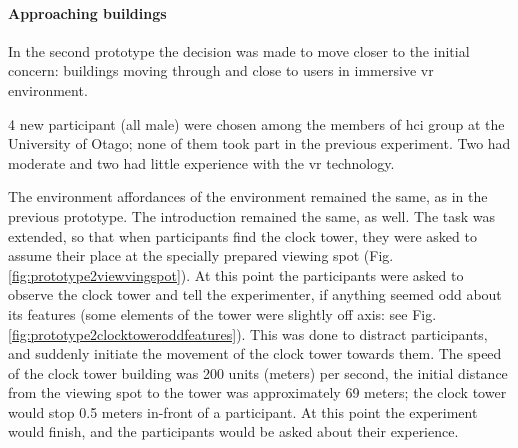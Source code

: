 \paragraph{Approaching buildings}
\label{par:approaching_building}
In the second prototype the decision was made to move closer to the initial concern: buildings moving through and close to users in immersive \gls{vr} environment.

4 new participant (all male) were chosen among the members of \gls{hci} group at the University of Otago; none of them took part in the previous experiment. Two had moderate and two had little experience with the \gls{vr} technology.

The environment affordances of the environment remained the same, as in the previous prototype. The introduction remained the same, as well. The task was extended, so that when participants find the clock tower, they were asked to assume their place at the specially prepared viewing spot (Fig. \ref{fig:prototype2viewvingspot}). At this point the participants were asked to observe the clock tower and tell the experimenter, if anything seemed odd about its features (some elements of the tower were slightly off axis: see Fig. \ref{fig:prototype2clocktoweroddfeatures}). This was done to distract participants, and suddenly initiate the movement of the clock tower towards them. The speed of the clock tower building was 200 units (meters) per second, the initial distance from the viewing spot to the tower was approximately 69 meters; the clock tower would stop 0.5 meters in-front of a participant. At this point the experiment would finish, and the participants would be asked about their experience.

